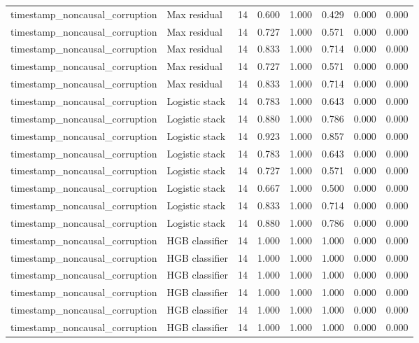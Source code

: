 {\begin{longtable}{llrrrrrr}
timestamp\_noncausal\_corruption & Max residual & 14 & 0.600 & 1.000 & 0.429 & 0.000 & 0.000 \\
timestamp\_noncausal\_corruption & Max residual & 14 & 0.727 & 1.000 & 0.571 & 0.000 & 0.000 \\
timestamp\_noncausal\_corruption & Max residual & 14 & 0.833 & 1.000 & 0.714 & 0.000 & 0.000 \\
timestamp\_noncausal\_corruption & Max residual & 14 & 0.727 & 1.000 & 0.571 & 0.000 & 0.000 \\
timestamp\_noncausal\_corruption & Max residual & 14 & 0.833 & 1.000 & 0.714 & 0.000 & 0.000 \\
timestamp\_noncausal\_corruption & Logistic stack & 14 & 0.783 & 1.000 & 0.643 & 0.000 & 0.000 \\
timestamp\_noncausal\_corruption & Logistic stack & 14 & 0.880 & 1.000 & 0.786 & 0.000 & 0.000 \\
timestamp\_noncausal\_corruption & Logistic stack & 14 & 0.923 & 1.000 & 0.857 & 0.000 & 0.000 \\
timestamp\_noncausal\_corruption & Logistic stack & 14 & 0.783 & 1.000 & 0.643 & 0.000 & 0.000 \\
timestamp\_noncausal\_corruption & Logistic stack & 14 & 0.727 & 1.000 & 0.571 & 0.000 & 0.000 \\
timestamp\_noncausal\_corruption & Logistic stack & 14 & 0.667 & 1.000 & 0.500 & 0.000 & 0.000 \\
timestamp\_noncausal\_corruption & Logistic stack & 14 & 0.833 & 1.000 & 0.714 & 0.000 & 0.000 \\
timestamp\_noncausal\_corruption & Logistic stack & 14 & 0.880 & 1.000 & 0.786 & 0.000 & 0.000 \\
timestamp\_noncausal\_corruption & HGB classifier & 14 & 1.000 & 1.000 & 1.000 & 0.000 & 0.000 \\
timestamp\_noncausal\_corruption & HGB classifier & 14 & 1.000 & 1.000 & 1.000 & 0.000 & 0.000 \\
timestamp\_noncausal\_corruption & HGB classifier & 14 & 1.000 & 1.000 & 1.000 & 0.000 & 0.000 \\
timestamp\_noncausal\_corruption & HGB classifier & 14 & 1.000 & 1.000 & 1.000 & 0.000 & 0.000 \\
timestamp\_noncausal\_corruption & HGB classifier & 14 & 1.000 & 1.000 & 1.000 & 0.000 & 0.000 \\
timestamp\_noncausal\_corruption & HGB classifier & 14 & 1.000 & 1.000 & 1.000 & 0.000 & 0.000 \\

\end{longtable}}
